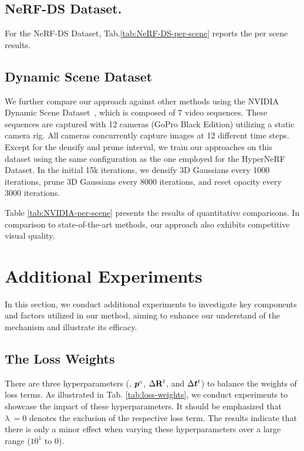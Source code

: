 \subsection{NeRF-DS Dataset.}  \label{sec-ap:NeRF-DS-results}
For the NeRF-DS Dataset, Tab.\ref{tab:NeRF-DS-per-scene} reports the per scene results. 

\subsection{Dynamic Scene Dataset}
We further compare our approach against other methods using the NVIDIA Dynamic Scene Dataset~\cite{Yoon2020NovelVS}, which is composed of 7 video sequences. These sequences are captured with 12 cameras (GoPro Black Edition) utilizing a static camera rig. All cameras concurrently capture images at 12 different time steps. Except for the densify and prune interval, we train our approaches on this dataset using the same configuration as the one employed for the HyperNeRF Dataset. In the initial 15k iterations, we densify 3D Gaussians every 1000 iterations, prune 3D Gaussians every 8000 iterations, and reset opacity every 3000 iterations.

Table \ref{tab:NVIDIA-per-scene} presents the results of quantitative comparisons. In comparison to state-of-the-art methods, our approach also exhibits competitive visual quality.


\section{Additional Experiments}\label{sec-ap:more-exp}
In this section, we conduct additional experiments to investigate key components and factors utilized in our method, aiming to enhance our understand of the mechanism and illustrate its efficacy. %

\subsection{The Loss Weights}
There are three hyperparameters (\ie, $\bm{p}^c$, $\Delta\mathbf{R}^t$, and $\Delta\bm{t}^t$) to balance the weights of loss terms. As illustrated in Tab. \ref{tab:loss-weights}, we conduct experiments to showcase the impact of these hyperparameters. It should be emphasized that $\lambda_{\cdot} = 0$ denotes the exclusion of the respective loss term. The results indicate that there is only a minor effect when varying these hyperparameters over a large range ($10^1$ to $0$).

